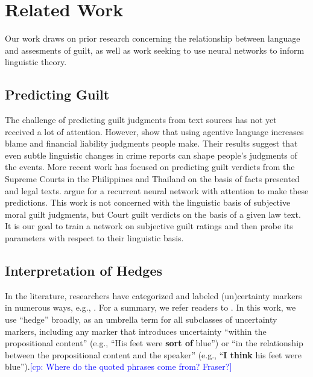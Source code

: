 \documentclass[11pt,a4paper]{article}
\newcommand{\cp}[1]{\textcolor{Blue}{[cp: #1]}}
\begin{document}
\section{Related Work}

Our work draws on prior research concerning the relationship between language and assesments of guilt, as well as work seeking to use neural networks to inform linguistic theory.


\subsection{Predicting Guilt}
The challenge of predicting guilt judgments from text sources has not yet received a lot of attention. 
However, \citeauthor{Fausey:Boroditsky:2010} show that using agentive language increases blame and financial liability judgments people make. Their results suggest that even subtle linguistic changes in crime reports can shape people's judgments of the events.
More recent work has focused on predicting guilt verdicts from the Supreme Courts in the Philippines \citep{virtucio2018predicting} and Thailand \citep{kowsrihawat2018predicting} on the basis of facts presented and legal texts. \citeauthor{kowsrihawat2018predicting} argue for a recurrent neural network with attention to make these predictions. This work is not concerned with the linguistic basis of subjective moral guilt judgments, but Court guilt verdicts on the basis of a given law text. 
It is our goal to train a network on subjective guilt ratings and then probe its parameters with respect to their linguistic basis.

\subsection{Interpretation of Hedges}

In the literature, researchers have categorized and labeled (un)certainty markers in numerous ways, e.g., \citep{lakoff1972hedges, prince1982hedging, brown1987politeness}. For a summary, we refer readers to \citealt{fraser2010pragmatic}. 
In this work, we use ``hedge'' broadly, as an umbrella term for all subclasses of uncertainty markers, including any marker that introduces uncertainty ``within the propositional content'' (e.g., ``His feet were \textbf{sort of} blue'') or ``in the relationship between the propositional content and the speaker'' (e.g., ``\textbf{I think} his feet were blue'').\cp{Where do the quoted phrases come from? Fraser?}
\end{document}
